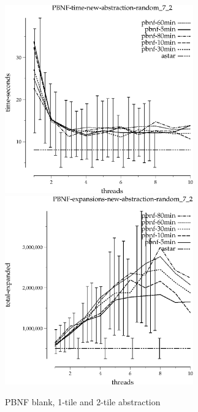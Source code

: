\documentclass{article}
\begin{document}
\begin{figure}
\begin{center}
\includegraphics[width=3.2in]{tiles_random_7_2/PBNF-time-new-abstraction-random_7_2}
\includegraphics[width=3.2in]{tiles_random_7_2/PBNF-expansions-new-abstraction-random_7_2}
\end{center}
\caption{PBNF blank, 1-tile and 2-tile abstraction}
\end{figure}
\end{document}
